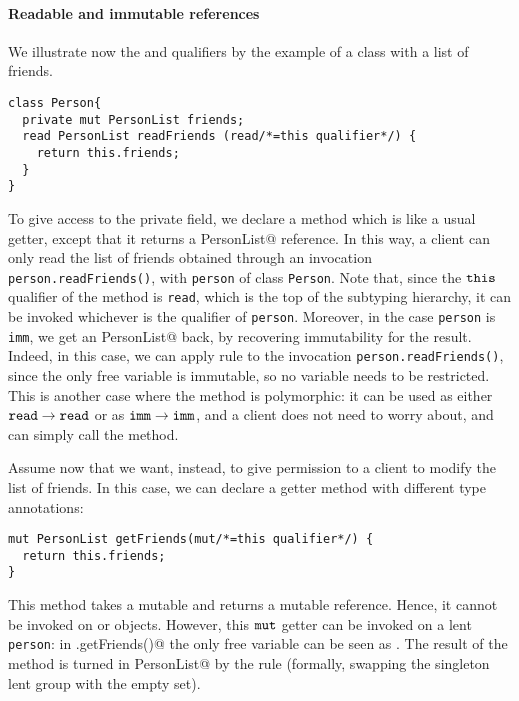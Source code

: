 \paragraph{Readable and immutable references}
We illustrate now the \Q@read@ and \Q@imm@ qualifiers by the example of a \Q@Person@ class with a list of friends.
\begin{lstlisting}
class Person{  
  private mut PersonList friends;  
  read PersonList readFriends (read/*=this qualifier*/) {
    return this.friends;
  }
}
\end{lstlisting}
To give access to the private field, we declare a method {which is like a usual getter, except} that it returns a \Q@read PersonList@ reference. 
In this way, a client can only read the list of friends obtained through an invocation \lstinline{person.readFriends()}{}, with \lstinline{person} of class \lstinline{Person}.
Note that, since the $\texttt{this}$ qualifier of the method is \lstinline{read}{}, which is the top of the subtyping hierarchy, it can be invoked whichever is the qualifier of \lstinline{person}.
Moreover, in the case \lstinline{person} is \lstinline{imm}, we get an \Q@imm PersonList@ back, by {recovering immutability for the \Q@read@ result}.
Indeed, in this case, we can apply rule  to the invocation \lstinline{person.readFriends()}, since the only free variable \Q@person@ is immutable, so no variable needs to be {restricted}.
{This is another case where the method is polymorphic: it can be used as either
$\texttt{read}\rightarrow\texttt{read}$ or as $\texttt{imm}\rightarrow\texttt{imm}$, and a client does not need to worry about, and can simply call the method.}

Assume now that we want, instead, to give permission to a client to modify the list of friends.
In this case, we can declare a getter method with different type annotations:\label{exposer}
\begin{lstlisting}
mut PersonList getFriends(mut/*=this qualifier*/) {
  return this.friends;
}
\end{lstlisting}
This method takes a mutable \Q@Person@ and returns a mutable \Q@PersonList@ reference.
Hence, it cannot be invoked on \Q@read@ or \Q@imm@ objects.
However, this $\texttt{mut}$ getter can be invoked on a lent \lstinline{person}{}:
in \Q@person.getFriends()@  the only free variable \Q@person@ can be seen as \Q@mut@.
The result of the method is turned in \Q@lent PersonList@ by the  rule {(formally, swapping the singleton {lent} group \Q@person@ with the empty set).}

